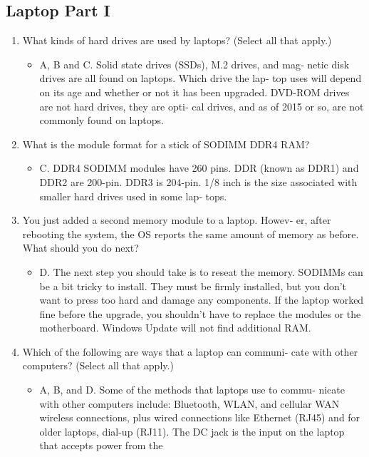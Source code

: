 \documentclass{article}
\begin{document}
\subsection{Laptop Part I}
\begin{enumerate}
    \item What kinds of hard drives are used by laptops? (Select all that
apply.) 
     \begin{itemize}
         \item A, B and C. Solid state drives (SSDs), M.2 drives, and mag‐
netic disk drives are all found on laptops. Which drive the lap‐
top uses will depend on its age and whether or not it has been
upgraded. DVD-ROM drives are not hard drives, they are opti‐
cal drives, and as of 2015 or so, are not commonly found on
laptops.
     \end{itemize}
     \item What is the module format for a stick of SODIMM DDR4
RAM?
     \begin{itemize}
         \item C. DDR4 SODIMM modules have 260 pins. DDR (known as
DDR1) and DDR2 are 200-pin. DDR3 is 204-pin. 1/8 inch is
the size associated with smaller hard drives used in some lap‐
tops.
     \end{itemize}
     \item You just added a second memory module to a laptop. Howev‐
er, after rebooting the system, the OS reports the same amount
of memory as before. What should you do next?
     \begin{itemize}
         \item D. The next step you should take is to reseat the memory.
SODIMMs can be a bit tricky to install. They must be firmly
installed, but you don’t want to press too hard and damage any
components. If the laptop worked fine before the upgrade, you
shouldn’t have to replace the modules or the motherboard.
Windows Update will not find additional RAM.
     \end{itemize}
     \item Which of the following are ways that a laptop can communi‐
cate with other computers? (Select all that apply.)
     \begin{itemize}
         \item A, B, and D. Some of the methods that laptops use to commu‐
nicate with other computers include: Bluetooth, WLAN, and
cellular WAN wireless connections, plus wired connections
like Ethernet (RJ45) and for older laptops, dial-up (RJ11). The
DC jack is the input on the laptop that accepts power from the

\end{itemize}
\end{enumerate}
\end{document}
